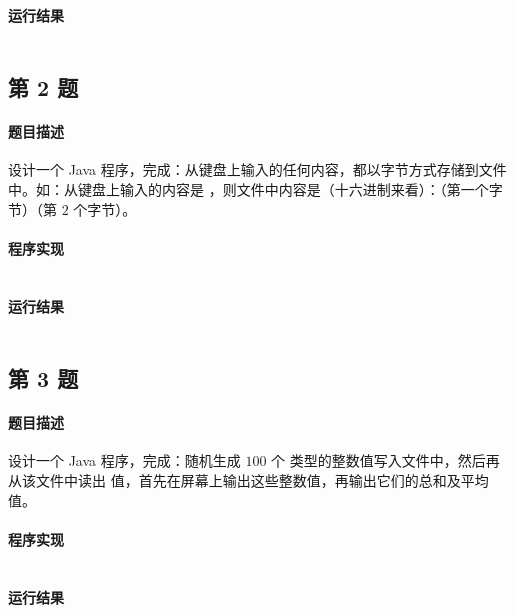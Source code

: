 \documentclass{academics}
\begin{document}
\paragraph{运行结果} {
    \inputminted{text}{../res/P01.out}
}

\subsection{第 2 题}

\paragraph{题目描述} {
    设计一个 Java 程序，完成：从键盘上输入的任何内容，都以字节方式存储到文件中。如：从键盘上输入的内容是 ，则文件中内容是（十六进制来看）：（第一个字节）（第 $2$ 个字节）。
}

\paragraph{程序实现} {
    \inputminted[label=KeyboardToFile.java]{java}{../src/P02/KeyboardToFile.java}
}

\paragraph{运行结果} {
    \inputminted{text}{../res/P02.out}
}

\subsection{第 3 题}

\paragraph{题目描述} {
    设计一个 Java 程序，完成：随机生成 $100$ 个  类型的整数值写入文件中，然后再从该文件中读出  值，首先在屏幕上输出这些整数值，再输出它们的总和及平均值。
}

\paragraph{程序实现} {
    \inputminted[label=RandomIntFile.java]{java}{../src/P03/RandomIntFile.java}
}

\paragraph{运行结果} {
    \inputminted{text}{../res/P03.out}
}
\end{document}
